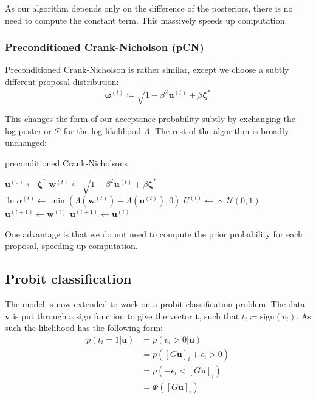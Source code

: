 \documentclass[]{article}
\newcommand{\loglik}{\Lambda}
\newcommand{\tbold}{\boldsymbol{t}}
\newcommand{\ubold}{\boldsymbol{u}}
\newcommand{\vbold}{\boldsymbol{v}}
\newcommand{\wbold}{\boldsymbol{w}}
\newcommand{\zetabold}{\boldsymbol{\zeta^*}}
\newcommand{\omegabold}{\boldsymbol{\omega}}
\newcommand{\Rho}{\mathcal{P}}
\begin{document}
As our algorithm depends only on the difference of the posteriors, there is no need to compute the constant term. This massively speeds up computation.

\subsubsection{Preconditioned Crank-Nicholson (pCN)}

Preconditioned Crank-Nicholson is rather similar, except we choose a subtly different proposal distribution:
%
\begin{equation}
	\omegabold^{(t)} \coloneqq \sqrt{1 - \beta^2} \ubold^{(t)} + \beta \zetabold
\end{equation}

This changes the form of our acceptance probability subtly by exchanging the log-posterior $\Rho$ for the log-likelihood $\loglik$. The rest of the algorithm is broadly unchanged:
%
\begin{algorithm}
	\caption{preconditioned Crank-Nicholsons}
	\label{alg:pCN}
	\begin{algorithmic}
		\State $\ubold^{(0)} \gets \zetabold$
		\State $\wbold^{(t)} \gets \sqrt{1 - \beta^2} \ubold^{(t)} + \beta \zetabold$ 
		\State $\ln \alpha^{(t)} \gets \min \left(\loglik(\wbold^{(t)}) - \loglik(\ubold^{(t)}), 0\right)$
		\State $U^{(t)} \gets \sim \mathcal{U}(0,1)$ \\
		\State $\ubold^{(t+1)} \gets \wbold^{(t)}$ 
		\Else
		\State $\ubold^{(t+1)} \gets \ubold^{(t)}$ 
		\EndIf
		\EndFor
	\end{algorithmic}
\end{algorithm}

One advantage is that we do not need to compute the prior probability for each proposal, speeding up computation.

\subsection{Probit classification}

The model is now extended to work on a probit classification problem. The data $\vbold$ is put through a sign function to give the vector $\tbold$, such that $t_i \coloneqq \textrm{sign}(v_i)$. As such the likelihood has the following form:
%
\begin{align}
	p(t_i = 1 | \ubold) &= p(v_i > 0 | \ubold) \nonumber \\
	&= p([G\ubold]_i + \epsilon_i > 0) \nonumber \\
	&= p(-\epsilon_i < [G\ubold]_i ) \nonumber \\
	&= \Phi([G\ubold]_i)
\end{align}
\end{document}
